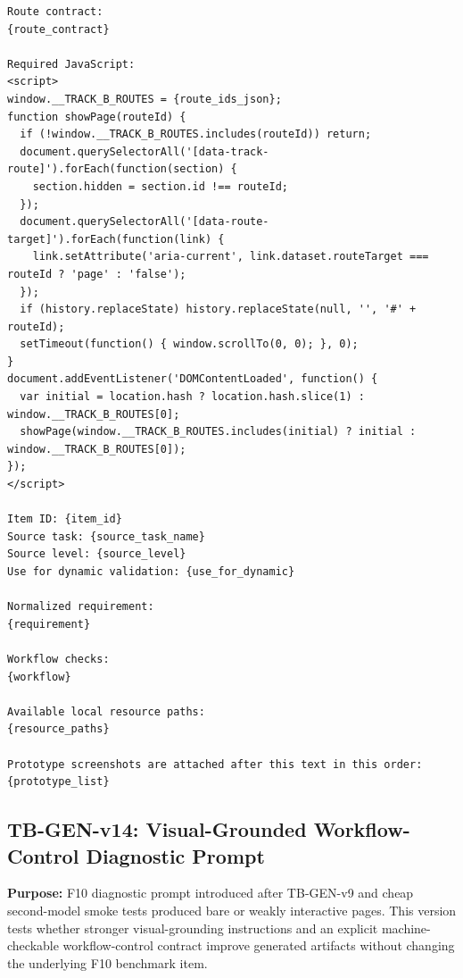 \begin{verbatim}
Route contract:
{route_contract}

Required JavaScript:
<script>
window.__TRACK_B_ROUTES = {route_ids_json};
function showPage(routeId) {
  if (!window.__TRACK_B_ROUTES.includes(routeId)) return;
  document.querySelectorAll('[data-track-route]').forEach(function(section) {
    section.hidden = section.id !== routeId;
  });
  document.querySelectorAll('[data-route-target]').forEach(function(link) {
    link.setAttribute('aria-current', link.dataset.routeTarget === routeId ? 'page' : 'false');
  });
  if (history.replaceState) history.replaceState(null, '', '#' + routeId);
  setTimeout(function() { window.scrollTo(0, 0); }, 0);
}
document.addEventListener('DOMContentLoaded', function() {
  var initial = location.hash ? location.hash.slice(1) : window.__TRACK_B_ROUTES[0];
  showPage(window.__TRACK_B_ROUTES.includes(initial) ? initial : window.__TRACK_B_ROUTES[0]);
});
</script>

Item ID: {item_id}
Source task: {source_task_name}
Source level: {source_level}
Use for dynamic validation: {use_for_dynamic}

Normalized requirement:
{requirement}

Workflow checks:
{workflow}

Available local resource paths:
{resource_paths}

Prototype screenshots are attached after this text in this order:
{prototype_list}
\end{verbatim}
\endgroup

\subsection{TB-GEN-v14: Visual-Grounded Workflow-Control Diagnostic Prompt}
\label{app:prompt-tb-gen-v14}

\textbf{Purpose:} F10 diagnostic prompt introduced after TB-GEN-v9 and cheap
second-model smoke tests produced bare or weakly interactive pages. This
version tests whether stronger visual-grounding instructions and an explicit
machine-checkable workflow-control contract improve generated artifacts without
changing the underlying F10 benchmark item.

